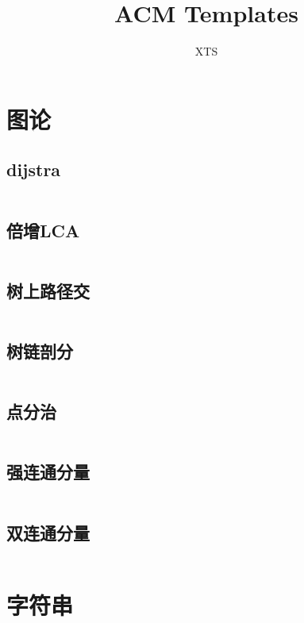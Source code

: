 \documentclass[a4paper,11pt]{article}
\author{XTS}
\title{ACM Templates}
\begin{document}
 
\maketitle 
\newpage
\tableofcontents




\newpage
\section{图论} %

\subsection{dijstra}
\inputminted[breaklines]{c++}{Graph/dijstra.cpp}

\subsection{倍增LCA}%
\inputminted[breaklines]{c++}{Graph/lca.cpp}

\subsection{树上路径交}
\inputminted[breaklines]{c++}{Graph/树上路径交.cpp}

\subsection{树链剖分}
\inputminted[breaklines]{c++}{Graph/树链剖分.cpp}

\subsection{点分治}
\inputminted[breaklines]{c++}{Graph/点分治.cpp}

\subsection{强连通分量}
\inputminted[breaklines]{c++}{Graph/scc.cpp}

\subsection{双连通分量}
\inputminted[breaklines]{c++}{Graph/bcc.cpp}







\newpage
\section{字符串}
\end{document}
